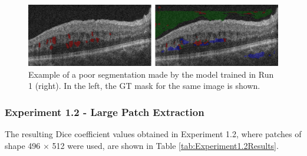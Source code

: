 \begin{figure}[!ht]
	\centering
	\includegraphics[width=1.0\linewidth]{figures/Experiment11Segmentation.png}
	\caption{Example of a poor segmentation made by the model trained in Run 1 (right). In the left, the GT mask for the same image is shown.}
	\label{fig:Experiment11Segmentation}
\end{figure}

\subsubsection{Experiment 1.2 - Large Patch Extraction}

The resulting Dice coefficient values obtained in Experiment 1.2, where patches of shape 496 $\times$ 512 were used, are shown in Table \ref{tab:Experiment1.2Results}.

